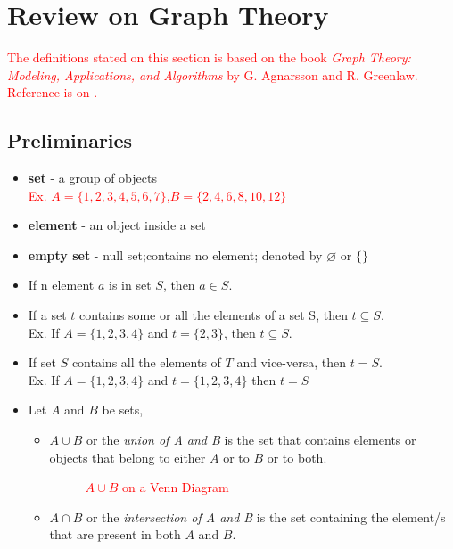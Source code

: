 \section{Review on Graph Theory  }
\textcolor{red}{The definitions stated on this section is based on the book \textit{Graph Theory: Modeling, Applications, and Algorithms} by G. Agnarsson and R. Greenlaw. Reference is on \cite{agnarsson2006graph}.}

\subsection{Preliminaries}
\begin{itemize}
\item \textbf{set} - a group of objects\\
\textcolor{red}{Ex. $A=\{1,2,3,4,5,6,7\}$,$B=\{2,4,6,8,10,12\}$ }
\item \textbf{element} - an object inside a set
\item \textbf{empty set} - null set;contains no element; denoted by $\varnothing$ or $\{\}$
\item If n element $a$ is in set $S$, then $a \in S $.
\item If a set $t$ contains some or all the elements of a set S, then $t \subseteq S$.\\
Ex. If $A=\{1,2,3,4\}$ and $t=\{2,3\}$, then $t \subseteq S$.
\item If set $S$ contains all the elements of $T$ and vice-versa, then $t=S$.\\
Ex. If $A=\{1,2,3,4\}$ and $t=\{1,2,3,4\}$ then $t=S$
\item Let $A$ and $B$ be sets,
\begin{itemize}
	\item $A \cup B$ or the \textit{union of A and B} is the set that contains elements or objects that belong to either $A$ or to $B$ or to both.
	\begin{figure}[h!]
	\centering
\caption{\textcolor{red}{$A \cup B$ on a Venn Diagram}}
	\end{figure}
	\item $A \cap B$ or the \textit{intersection of A and B} is the set containing the element/s that are present in both $A$ and $B$.

\end{itemize}
\end{itemize}

